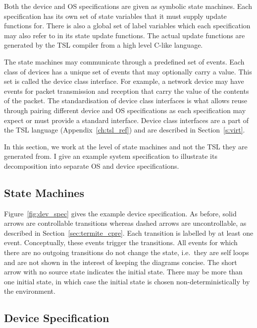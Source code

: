Both the device and OS specifications are given as symbolic state machines. Each specification has its own set of state variables that it must supply update functions for. There is also a global set of label variables which each specification may also refer to in its state update functions. The actual update functions are generated by the TSL compiler from a high level C-like language. 

The state machines may communicate through a predefined set of events. Each class of devices has a unique set of events that may optionally carry a value. This set is called the device class interface. For example, a network device may have events for packet transmission and reception that carry the value of the contents of the packet. The standardisation of device class interfaces is what allows reuse through pairing different device and OS specifications as each specification may expect or must provide a standard interface. Device class interfaces are a part of the TSL language (Appendix~\ref{ch:tsl_ref}) and are described in Section~\ref{s:virt}.

In this section, we work at the level of state machines and not the TSL they are generated from. I give an example system specification to illustrate its decomposition into separate OS and device specifications. 

\subsection{State Machines}

Figure~\ref{fig:dev_spec} gives the example device specification. As before, solid arrows are controllable transitions whereas dashed arrows are uncontrollable, as described in Section~\ref{sec:termite_cpre}. Each transition is labelled by at least one event. Conceptually, these events trigger the transitions. All events for which there are no outgoing transitions do not change the state, i.e.\ they are self loops and are not shown in the interest of keeping the diagrams concise. The short arrow with no source state indicates the initial state. There may be more than one initial state, in which case the initial state is chosen non-deterministically by the environment.

\subsection{Device Specification}

